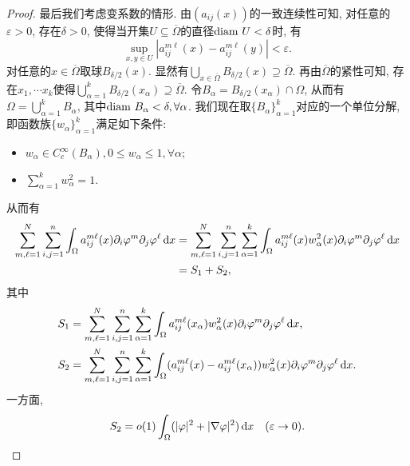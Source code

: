 \begin{lemma}[G\r arding不等式]
\begin{proof}
        最后我们考虑变系数的情形. 由$(a_{ij}(x))$的一致连续性可知, 对任意的$\varepsilon > 0$, 存在$\delta > 0$, 使得当开集$U \subseteq \overline{\Omega}$的直径${\rm diam}\ U < \delta$时, 有
        \begin{equation*}
            \sup_{x, y \in U}|a_{ij}^{m\ell}(x) - a_{ij}^{m\ell}(y)| < \varepsilon.
        \end{equation*}
        对任意的$x \in \overline{\Omega}$取球$B_{\delta/2}(x)$. 显然有$\bigcup_{x \in \overline{\Omega}}B_{\delta/2}(x) \supseteq \overline{\Omega}$.
        再由$\overline{\Omega}$的紧性可知, 存在$x_1, \cdots x_k$使得$\bigcup_{\alpha = 1}^kB_{\delta/2}(x_{\alpha}) \supseteq \overline{\Omega}$.
        令$B_{\alpha} = B_{\delta/2}(x_{\alpha}) \cap \Omega$, 从而有$\Omega = \bigcup_{\alpha = 1}^kB_{\alpha}$, 其中${\rm diam}\ B_{\alpha} < \delta, \forall \alpha$.
        我们现在取$\{B_{\alpha}\}_{\alpha = 1}^k$对应的一个单位分解, 即函数族$\{w_{\alpha}\}_{\alpha = 1}^k$满足如下条件:
        \begin{itemize}
            \item $w_{\alpha} \in C_c^{\infty}(B_{\alpha}), 0 \leq w_{\alpha} \leq 1, \forall \alpha$;
            \item $\sum_{\alpha = 1}^kw_{\alpha}^2 = 1$.
        \end{itemize}
        从而有 
        \begin{align*}
            \sum_{m, \ell = 1}^N\sum_{i, j = 1}^n\int_{\Omega}a_{ij}^{m\ell}(x)\partial_i\varphi^m\partial_j\varphi^\ell \,{\rm d}x &= \sum_{m, \ell = 1}^N\sum_{i, j = 1}^n\sum_{\alpha = 1}^k\int_{\Omega}a_{ij}^{m\ell}(x)w_{\alpha}^2(x)\partial_i\varphi^m\partial_j\varphi^\ell \,{\rm d}x \\ 
            &= S_1 + S_2,
        \end{align*}
        其中 
        \begin{align*}
            S_1 &=  \sum_{m, \ell = 1}^N\sum_{i, j = 1}^n\sum_{\alpha = 1}^k\int_{\Omega}a_{ij}^{m\ell}(x_{\alpha})w_{\alpha}^2(x)\partial_i\varphi^m\partial_j\varphi^\ell \,{\rm d}x, \\ 
            S_2 &=  \sum_{m, \ell = 1}^N\sum_{i, j = 1}^n\sum_{\alpha = 1}^k\int_{\Omega}(a_{ij}^{m\ell}(x) - a_{ij}^{m\ell}(x_{\alpha}))w_{\alpha}^2(x)\partial_i\varphi^m\partial_j\varphi^\ell \,{\rm d}x.
        \end{align*}
        一方面, 
        \begin{equation*}
            S_2 = o(1)\int_{\Omega}(|\varphi|^2 + |\nabla\varphi|^2) \,{\rm d}x \quad (\varepsilon \rightarrow 0).

\end{equation*}
\end{proof}
\end{lemma}
